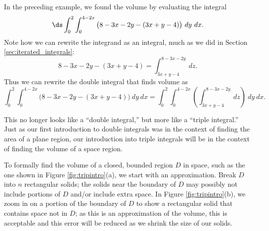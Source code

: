 In the preceding example, we found the volume by evaluating the integral $$\ds \int_0^2\int_0^{4-2x} \big(8-3x-2y-(3x+y-4)\big)\ dy\ dx.$$ Note how we can rewrite the integrand as an integral, much as we did in Section \ref{sec:iterated_integrals}:
$$8-3x-2y-(3x+y-4) = \int_{3x+y-4}^{8-3x-2y}\ dz.$$
Thus we can rewrite the double integral that finds volume as
$$\int_0^2\int_0^{4-2x} \big(8-3x-2y-(3x+y-4)\big)\ dy\ dx = \int_0^2\int_0^{4-2x}\left(\int_{3x+y-4}^{8-3x-2y}\ dz\right)\ dy\ dx.$$

This no longer looks like a ``double integral,'' but more like a ``triple integral.'' Just as our first introduction to double integrals was in the context of finding the area of a plane region, our introduction into triple integrals will be in the context of finding the volume of a space region.

To formally find the volume of a closed, bounded region $D$ in space, such as the one shown in Figure \ref{fig:tripintro}(a), we start with an approximation. Break $D$ into $n$ rectangular solids; the solids near the boundary of $D$ may possibly not include portions of $D$ and/or include extra space. In Figure \ref{fig:tripintro}(b), we zoom in on a portion of the boundary of $D$ to show a rectangular solid that contains space not in $D$; as this is an approximation of the volume, this is acceptable and this error will be reduced as we shrink the size of our solids.

